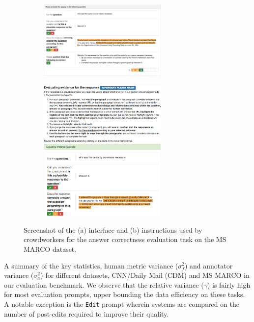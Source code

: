\begin{figure}
  \begin{subfigure}{\textwidth}
    \centering
    \includegraphics[width=0.7\textwidth]{figures/msmarco_interface}
    \caption{\label{fig:msmarco-interface}}
  \end{subfigure}
  \begin{subfigure}{\textwidth}
    \centering
    \includegraphics[width=0.7\textwidth]{figures/msmarco_tutorial}
    \caption{\label{fig:msmarco-tutorial}}
  \end{subfigure}
  \caption{\label{fig:interfaces-qa}Screenshot of the (a) interface and (b) instructions used by crowdworkers for the answer correctness evaluation task on the MS MARCO dataset.}
\end{figure}


\begin{table}[t]
  \centering
  
  \caption[Key statistics of the data collected]{\label{tab:dataset} A summary of the key statistics, human metric variance ($\sigma^2_f$) and annotator variance ($\sigma^2_a$) for different datasets, CNN/Daily Mail (CDM) and MS MARCO in our evaluation benchmark.
  We observe that the relative variance ($\gamma$) is fairly high for most evaluation prompts, upper bounding the data efficiency on these tasks.
  A notable exception is the \texttt{Edit} prompt wherein systems are compared on the number of post-edits required to improve their quality.
  }
\end{table}

